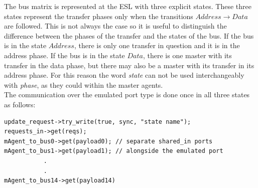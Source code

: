 The bus matrix is represented at the ESL with three explicit states. These three states represent the transfer phases only when the transitions $Address\rightarrow Data$ are followed. This is not always the case so it is useful to distinguish the difference between the phases of the transfer and the states of the bus. If the bus is in the state $Address$, there is only one transfer in question and it is in the address phase. If the bus is in the state $Data$, there is one master with its transfer in the data phase, but there may also be a master with its transfer in its address phase. For this reason the word \textit{state} can not be used interchangeably with \textit{phase}, as they could within the master agents. \\
The communication over the emulated port type is done once in all three states as follows: \\
\begin{lstlisting}
update_request->try_write(true, sync, "state name");
requests_in->get(reqs);
mAgent_to_bus0->get(payload0); // separate shared_in ports 
mAgent_to_bus1->get(payload1); // alongside the emulated port
           .
           .
mAgent_to_bus14->get(payload14)
\end{lstlisting}   

